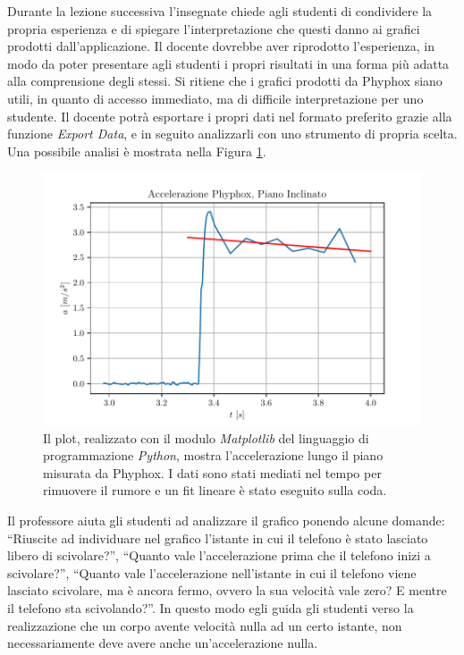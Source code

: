 \documentclass{report} \usepackage[T1]{fontenc} \usepackage[italian]{babel}
\begin{document}
Durante la lezione successiva l'insegnate chiede agli studenti
di condividere la propria esperienza e di spiegare l'interpretazione
che questi danno ai grafici prodotti dall'applicazione.
Il docente dovrebbe aver riprodotto l'esperienza, in modo
da poter presentare agli studenti i propri risultati in una
forma più adatta alla comprensione degli stessi.
Si ritiene che i grafici prodotti da Phyphox siano utili,
in quanto di accesso immediato, ma di difficile interpretazione
per uno studente. Il docente potrà esportare i propri
dati nel formato preferito grazie alla funzione
\emph{Export Data}, e in seguito analizzarli con uno
strumento di propria scelta.
Una possibile analisi è mostrata nella Figura \ref{fig:a_phyphox}.
\begin{figure}[H]
\centering
  \includegraphics[width=\textwidth]{a_phyphox}
  \caption{Il plot, realizzato con il modulo \emph{Matplotlib}
           del linguaggio di programmazione \emph{Python},
           mostra l'accelerazione lungo il piano misurata da
           Phyphox. I dati sono stati mediati nel tempo
           per rimuovere il rumore e un fit lineare è stato
           eseguito sulla coda.
          }
  \label{fig:a_phyphox}
\end{figure}
Il professore aiuta gli studenti ad analizzare il grafico ponendo
alcune domande: ``Riuscite ad individuare nel grafico l'istante
in cui il telefono è stato lasciato libero di scivolare?'',
``Quanto vale l'accelerazione prima che il telefono inizi a
scivolare?'', ``Quanto vale l'accelerazione nell'istante
in cui il telefono viene lasciato scivolare, ma è ancora fermo,
ovvero la sua velocità vale zero? E mentre il telefono sta
scivolando?''. In questo modo egli guida gli studenti verso
la realizzazione che un corpo avente velocità nulla ad un certo
istante, non necessariamente deve avere anche un'accelerazione nulla.
\end{document}
